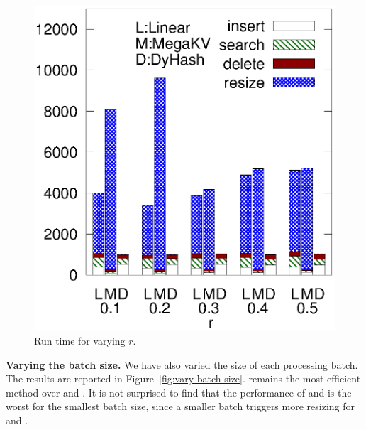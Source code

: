 \begin{figure}[h]
\begin{minipage}{0.18\linewidth}
		\centerline{\dsali}
	\end{minipage}
	\hfill
	\begin{minipage}{0.18\linewidth}\centering
		\includegraphics[width=\linewidth]{pic/dynamic/random/diff_r.eps}
		\centerline{\dsrandom}
	\end{minipage}
	\caption{Run time for varying $r$.}
	\label{fig:vary-r-time}
\end{figure}

\vspace{1mm}\noindent\textbf{Varying the batch size.}
We have also varied the size of each processing batch. The results are reported in Figure~\ref{fig:vary-batch-size}. \voter remains the most efficient method over \linear and \megakv. It is not surprised to find that the performance of \linear and \megakv is the worst for the smallest batch size, since a smaller batch triggers more resizing for \linear and \megakv. 

